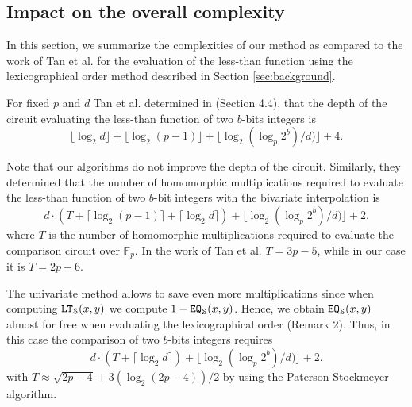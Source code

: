   \subsection{Impact on the overall complexity}
  In this section, we summarize the complexities of our method as compared to the work of Tan et al. for the evaluation of the less-than function using the lexicographical order method described in Section \ref{sec:background}.

  For fixed $p$ and $d$ Tan et al. determined in \cite{TLWRK20} (Section 4.4), that the depth of the circuit evaluating the less-than function of two $b$-bits integers is 
  \begin{equation}
    \label{eq:circuit-depth}
    \lfloor \log_2 d \rfloor + \lfloor \log_2 (p-1) \rfloor + \lfloor \log_2 (\log_p 2^b)/d) \rfloor + 4.
  \end{equation}
  
  Note that our algorithms do not improve the depth of the circuit. Similarly, they determined that the number of homomorphic multiplications required to evaluate the less-than function of two $b$-bit integers with the bivariate interpolation is
  $$ d\cdot\left(T+ \lceil\log_2(p-1)\rceil + \lceil \log_2 d \rceil \right) + \lfloor\log_2(\log_p 2^b)/d)\rfloor+2. $$
  where $T$ is the number of homomorphic multiplications required to evaluate the comparison circuit over $\mathbb{F}_p$. In the work of Tan et al. $T = 3p-5$, while in our case it is $T = 2p-6$.

  The univariate method allows to save even more multiplications since when computing $\mathtt{LT}_{\mathcal{S}}(x,y)$ we compute $1 - \mathtt{EQ}_{\mathcal{S}}(x,y)$. 
  Hence, we obtain $\mathtt{EQ}_{\mathcal{S}}(x,y)$ almost for free when evaluating the lexicographical order (Remark 2). Thus, in this case the comparison of two $b$-bits integers requires
  $$ d\cdot\left(T + \lceil \log_2 d \rceil \right) + \lfloor\log_2(\log_p 2^b)/d)\rfloor+2. $$
  with $T\approx \sqrt{2p-4}+3(\log_2(2p-4))/2$ by using the Paterson-Stockmeyer algorithm.
  
